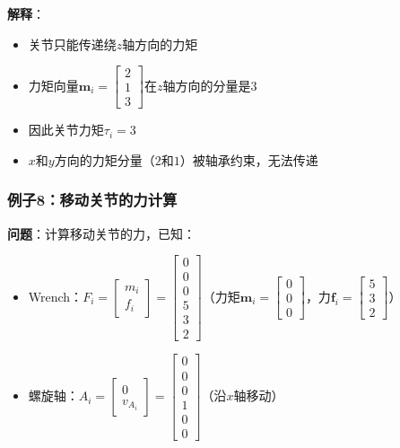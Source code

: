 \documentclass[12pt,a4paper]{article}
\begin{document}
\textbf{解释}：
\begin{itemize}
\item 关节只能传递绕$z$轴方向的力矩
\item 力矩向量$\bm{m}_i = \begin{bmatrix} 2 \\ 1 \\ 3 \end{bmatrix}$在$z$轴方向的分量是$3$
\item 因此关节力矩$\tau_i = 3$
\item $x$和$y$方向的力矩分量（$2$和$1$）被轴承约束，无法传递
\end{itemize}

\subsubsection{例子8：移动关节的力计算}

\textbf{问题}：计算移动关节的力，已知：
\begin{itemize}
\item Wrench：$F_i = \begin{bmatrix} m_i \\ f_i \end{bmatrix} = \begin{bmatrix} 0 \\ 0 \\ 0 \\ 5 \\ 3 \\ 2 \end{bmatrix}$（力矩$\bm{m}_i = \begin{bmatrix} 0 \\ 0 \\ 0 \end{bmatrix}$，力$\bm{f}_i = \begin{bmatrix} 5 \\ 3 \\ 2 \end{bmatrix}$）
\item 螺旋轴：$A_i = \begin{bmatrix} 0 \\ v_{A_i} \end{bmatrix} = \begin{bmatrix} 0 \\ 0 \\ 0 \\ 1 \\ 0 \\ 0 \end{bmatrix}$（沿$x$轴移动）
\end{itemize}
\end{document}
